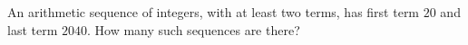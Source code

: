An arithmetic sequence of integers, with at least two terms, has first term $20$ and last term $2040$. How many such sequences are there?

